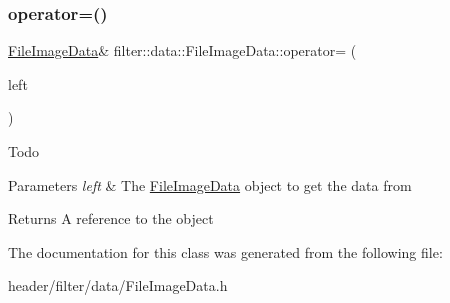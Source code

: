 \mbox{\label{classfilter_1_1data_1_1_file_image_data_abd280bc0cc3d1a1e6aa1924041a71820}} 
\subsubsection{\texorpdfstring{operator=()}{operator=()}}
{\footnotesize\ttfamily \hyperlink{classfilter_1_1data_1_1_file_image_data}{File\+Image\+Data}\& filter\+::data\+::\+File\+Image\+Data\+::operator= (\begin{DoxyParamCaption}\item[{const \hyperlink{classfilter_1_1data_1_1_file_image_data}{File\+Image\+Data} \&}]{left }\end{DoxyParamCaption})\hspace{0.3cm}{\ttfamily [inline]}}

\begin{DoxyRefDesc}{Todo}
\item[\hyperlink{todo__todo000020}{Todo}]\end{DoxyRefDesc}

\begin{DoxyParams}{Parameters}
{\em left} & The \hyperlink{classfilter_1_1data_1_1_file_image_data}{File\+Image\+Data} object to get the data from \\
\hline
\end{DoxyParams}
\begin{DoxyReturn}{Returns}
A reference to the object 
\end{DoxyReturn}


The documentation for this class was generated from the following file\+:\begin{DoxyCompactItemize}
\item 
header/filter/data/File\+Image\+Data.\+h\end{DoxyCompactItemize}
